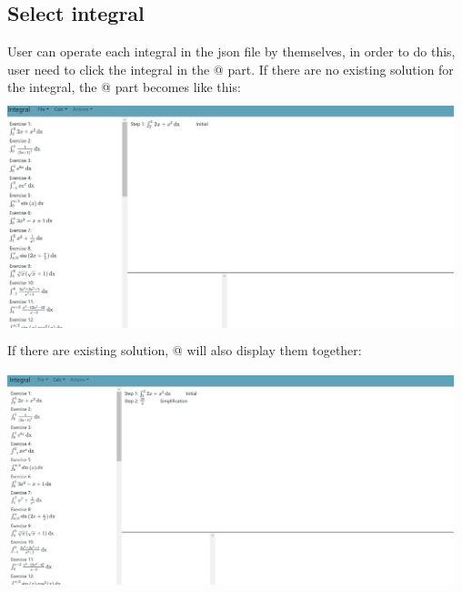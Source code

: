 \documentclass[titlepage]{article}
\makeatletter
\newcommand*{\rom}[1]{\expandafter\@slowromancap\romannumeral #1@}
\makeatother
\begin{document}
\subsection{Select integral}
User can operate each integral in the json file by themselves, in order to do this, user need to click the integral in the \rom{2} part. If there are  no existing solution for the integral, the \rom{3} part becomes like this:\\
\includegraphics[width=13cm, height=7cm]{5.png}
If there are existing solution, \rom{3} will also display them together:\\
\includegraphics[width=13cm, height=7cm]{6.png}
\end{document}
